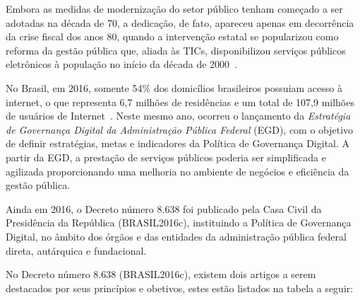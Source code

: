 Embora as medidas de modernização do setor público tenham começado a ser adotadas na década de 70, a dedicação, de fato, 
apareceu apenas em decorrência da crise fiscal dos anos 80, quando a intervenção estatal se popularizou como reforma da gestão 
pública que, aliada às TICs, disponibilizou serviços públicos eletrônicos à população no início da década de 2000~\cite{przeybilovicz2015desenvolvimento}.

No Brasil, em 2016, somente 54\% dos domicílios brasileiros possuiam acesso à internet, o que representa 6,7 milhões de residências
e um total de 107,9 milhões de usuários de Internet~\cite{CGI}. Neste mesmo ano, ocorreu o lançamento da \textit{Estratégia de Governança Digital da Administração Pública Federal} (EGD),
com o objetivo de definir estratégias, metas e indicadores da Política de Governança Digital. A partir da EGD, a prestação de serviços
públicos poderia ser simplificada e agilizada proporcionando uma melhoria no ambiente de negócios e eficiência da gestão pública.

Ainda em 2016, o Decreto número 8.638 foi publicado pela Casa Civil da Presidência da República (BRASIL2016c), instituindo a 
Política de Governança Digital, no âmbito dos órgãos e das entidades da administração pública federal direta, autárquica e 
fundacional. 

No Decreto número 8.638 (BRASIL2016c), existem dois artigos a serem destacados por seus princípios e obetivos, estes estão 
listados na tabela a seguir:

    \begin{table}[h]
        \end{table}

